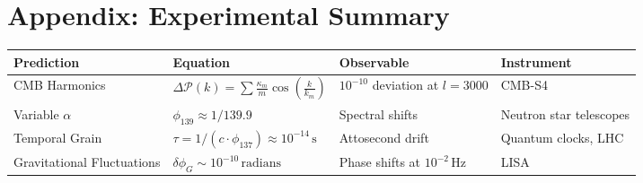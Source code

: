 \documentclass[12pt]{article}
\begin{document}
\section*{Appendix: Experimental Summary}
\begin{tabularx}{\textwidth}{|l|X|l|l|}
\hline
\textbf{Prediction} & \textbf{Equation} & \textbf{Observable} & \textbf{Instrument} \\
\hline
CMB Harmonics & \(\Delta \mathcal{P}(k) = \sum \frac{\kappa_m}{m} \cos\left(\frac{k}{k_m}\right)\) & \(10^{-10}\) deviation at \(l = 3000\) & CMB-S4 \\
\hline
Variable \(\alpha\) & \(\phi_{139} \approx 1/139.9\) & Spectral shifts & Neutron star telescopes \\
\hline
Temporal Grain & \(\tau = 1/(c \cdot \phi_{137}) \approx 10^{-14} \, \text{s}\) & Attosecond drift & Quantum clocks, LHC \\
\hline
Gravitational Fluctuations & \(\delta \phi_G \sim 10^{-10} \, \text{radians}\) & Phase shifts at \(10^{-2} \, \text{Hz}\) & LISA \\
\hline
\end{tabularx}
\end{document}
